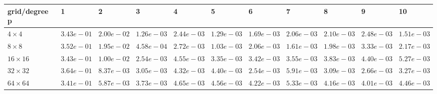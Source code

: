 \begin{tabular}{lllllllllll}
\hline
 grid/degree p   & 1          & 2          & 3          & 4          & 5          & 6          & 7          & 8          & 9          & 10         \\
\hline
 $4 \times 4$    & $3.43e-01$ & $2.00e-02$ & $1.26e-03$ & $2.44e-03$ & $1.29e-03$ & $1.69e-03$ & $2.06e-03$ & $2.10e-03$ & $2.48e-03$ & $1.51e-03$ \\
 $8 \times 8$    & $3.52e-01$ & $1.95e-02$ & $4.58e-04$ & $2.72e-03$ & $1.03e-03$ & $2.06e-03$ & $1.61e-03$ & $1.98e-03$ & $3.33e-03$ & $2.17e-03$ \\
 $16 \times 16$  & $3.43e-01$ & $1.00e-02$ & $2.54e-03$ & $4.55e-03$ & $3.35e-03$ & $3.42e-03$ & $3.55e-03$ & $3.83e-03$ & $4.40e-03$ & $5.27e-03$ \\
 $32 \times 32$  & $3.64e-01$ & $8.37e-03$ & $3.05e-03$ & $4.32e-03$ & $4.40e-03$ & $2.54e-03$ & $5.91e-03$ & $3.09e-03$ & $2.66e-03$ & $3.27e-03$ \\
 $64 \times 64$  & $3.41e-01$ & $5.87e-03$ & $3.73e-03$ & $4.65e-03$ & $4.56e-03$ & $4.22e-03$ & $5.33e-03$ & $4.16e-03$ & $4.01e-03$ & $4.46e-03$ \\
\hline
\end{tabular}